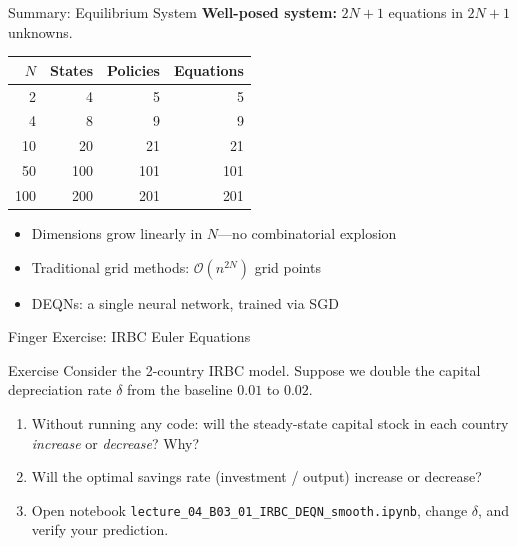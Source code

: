 \documentclass[aspectratio=169,11pt]{beamer}
\newcommand{\emphc}[1]{\textcolor{harvardcrimson}{#1}}
\begin{document}
\begin{frame}{Summary: Equilibrium System}
\textbf{Well-posed system:} $2N+1$ equations in $2N+1$ unknowns.

\vspace{0.5em}
\begin{center}
\begin{tabular}{rrrr}
\toprule
$N$ & \textbf{States} & \textbf{Policies} & \textbf{Equations} \\
\midrule
2 & 4 & 5 & 5 \\
4 & 8 & 9 & 9 \\
10 & 20 & 21 & 21 \\
50 & 100 & 101 & 101 \\
100 & 200 & 201 & 201 \\
\bottomrule
\end{tabular}
\end{center}

\vspace{0.3em}
\begin{itemize}
    \item Dimensions grow \emphc{linearly} in $N$---no combinatorial explosion
    \item Traditional grid methods: $\mathcal{O}(n^{2N})$ grid points
    \item DEQNs: a single neural network, trained via SGD
\end{itemize}
\end{frame}

\begin{frame}{\exercisepause{} Finger Exercise: IRBC Euler Equations}
\begin{exampleblock}{Exercise}
Consider the 2-country IRBC model. Suppose we \emphc{double} the capital depreciation rate $\delta$ from the baseline $0.01$ to $0.02$.
\begin{enumerate}
    \item Without running any code: will the steady-state capital stock in each country \emph{increase} or \emph{decrease}? Why?
    \item Will the optimal savings rate (investment / output) increase or decrease?
    \item Open notebook \texttt{lecture\_04\_B03\_01\_IRBC\_DEQN\_smooth.ipynb}, change $\delta$, and verify your prediction.
\end{enumerate}
\end{exampleblock}
\end{frame}
\end{document}
